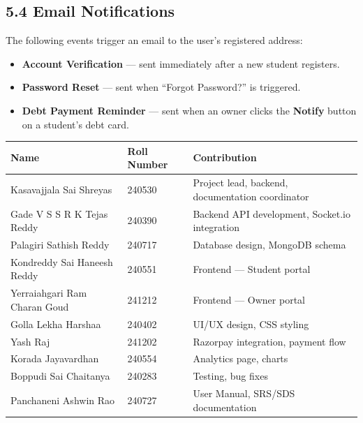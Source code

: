 \documentclass[a4paper,12pt]{article}
\newcommand{\sectionbar}[1]{%
    \colorbox{headergray}{%
        \makebox[\dimexpr\textwidth-2\fboxsep][c]{%
            \bfseries\textcolor{white}{\LARGE #1}%
        }%
    }%
}
\begin{document}
\subsection*{5.4 Email Notifications}

The following events trigger an email to the user's registered address:

\begin{itemize}
    \item \textbf{Account Verification} --- sent immediately after a new student registers.
    \item \textbf{Password Reset} --- sent when ``Forgot Password?'' is triggered.
    \item \textbf{Debt Payment Reminder} --- sent when an owner clicks the \textbf{Notify} button on a student's debt card.
\end{itemize}

\newpage

\label{app:group_log}
\sectionbar{APPENDIX A --- GROUP LOG}

\vspace{0.6cm}

\renewcommand{\arraystretch}{1.5}
\setlength{\arrayrulewidth}{1pt}

\begin{center}
\begin{tabular}{|p{3.5cm}|p{3.5cm}|p{7.3cm}|}
\hline
\rowcolor{gray!20}\textbf{Name} & \textbf{Roll Number} & \textbf{Contribution} \\ \hline
Kasavajjala Sai Shreyas     & 240530 & Project lead, backend, documentation coordinator \\ \hline
Gade V S S R K Tejas Reddy  & 240390 & Backend API development, Socket.io integration \\ \hline
Palagiri Sathish Reddy      & 240717 & Database design, MongoDB schema \\ \hline
Kondreddy Sai Haneesh Reddy & 240551 & Frontend --- Student portal \\ \hline
Yerraiahgari Ram Charan Goud & 241212 & Frontend --- Owner portal \\ \hline
Golla Lekha Harshaa          & 240402 & UI/UX design, CSS styling \\ \hline
Yash Raj                     & 241202 & Razorpay integration, payment flow \\ \hline
Korada Jayavardhan           & 240554 & Analytics page, charts \\ \hline
Boppudi Sai Chaitanya        & 240283 & Testing, bug fixes \\ \hline
Panchaneni Ashwin Rao        & 240727 & User Manual, SRS/SDS documentation \\ \hline
\end{tabular}
\end{center}
\end{document}
